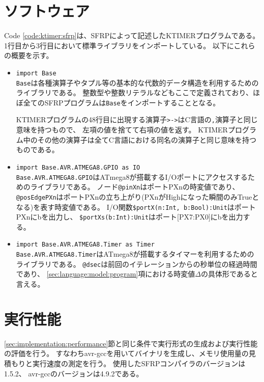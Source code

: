 \clearpage
\section{ソフトウェア}
Code \ref{code:ktimer:sfrp}は、SFRPによって記述したKTIMERプログラムである。
1行目から3行目において標準ライブラリをインポートしている。
以下にこれらの概要を示す。

\begin{itemize}
  \item \texttt{import Base}\\
  \texttt{Base}は各種演算子やタプル等の基本的な代数的データ構造を利用するためのライブラリである。
  整数型や整数リテラルなどもここで定義されており、ほぼ全てのSFRPプログラムは\texttt{Base}をインポートすることとなる。

  KTIMERプログラムの48行目に出現する演算子\texttt{>->}はC言語の\texttt{,}演算子と同じ意味を持つもので、
  左項の値を捨てて右項の値を返す。
  KTIMERプログラム中のその他の演算子は全てC言語における同名の演算子と同じ意味を持つものである。

  \item \texttt{import Base.AVR.ATMEGA8.GPIO as IO}\\
  \texttt{Base.AVR.ATMEGA8.GPIO}はATmega8が搭載するI/Oポートにアクセスするためのライブラリである。
  ノード\texttt{@pinXn}はポートPXnの時変値であり、
  \texttt{@posEdgePXn}はポートPXnの立ち上がり(PXnがHighになった瞬間のみTrueとなる)を表す時変値である。
  I/O関数\texttt{\$portX(n:Int, b:Bool):Unit}はポートPXnにbを出力し、
  \texttt{\$portXs(b:Int):Unit}はポート[PX7:PX0]にbを出力する。

  \item \texttt{import Base.AVR.ATMEGA8.Timer as Timer}\\
  \texttt{Base.AVR.ATMEGA8.Timer}はATmega8が搭載するタイマーを利用するためのライブラリである。
  \texttt{@dsec}は前回のイテレーションからの秒単位の経過時間であり、
  \ref{sec:language:model:program}項における時変値$\Delta$の具体形であると言える。
\end{itemize}


\clearpage


\section{実行性能}
\ref{sec:implementation:performance}節と同じ条件で実行形式の生成および実行性能の評価を行う。
すなわちavr-gccを用いてバイナリを生成し、メモリ使用量の見積もりと実行速度の測定を行う。
使用したSFRPコンパイラのバージョンは1.5.2、
avr-gccのバージョンは4.9.2である。

